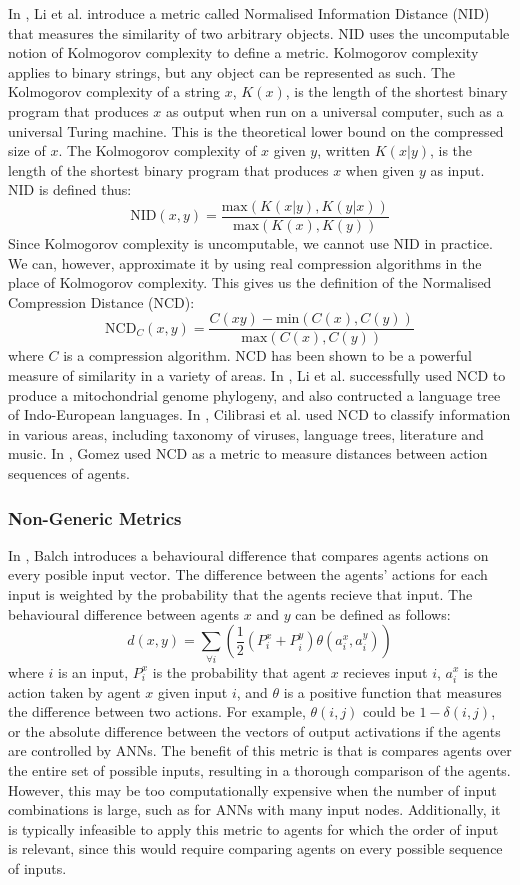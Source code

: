 \documentclass[12pt]{article} %
\begin{document}
In \cite{Li2004}, Li et al. introduce a metric called Normalised Information Distance (NID) that measures the similarity of two arbitrary objects. NID uses the uncomputable notion of Kolmogorov complexity to define a metric. Kolmogorov complexity applies to binary strings, but any object can be represented as such. The Kolmogorov complexity of a string $x$, $K(x)$, is the length of the shortest binary program that produces $x$ as output when run on a universal computer, such as a universal Turing machine. This is the theoretical lower bound on the compressed size of $x$. The Kolmogorov complexity of $x$ given $y$, written $K(x|y)$, is the length of the shortest binary program that produces $x$ when given $y$ as input. NID is defined thus:
\[
\text{NID}(x,y) = \frac{\text{max}(K(x|y), K(y|x))}{\text{max}(K(x), K(y))}
\]
Since Kolmogorov complexity is uncomputable, we cannot use NID in practice. We can, however, approximate it by using real compression algorithms in the place of Kolmogorov complexity. This gives us the definition of the Normalised Compression Distance (NCD):
\[
\text{NCD}_C(x,y) = \frac{C(xy) - \text{min}(C(x), C(y))}{\text{max}(C(x),C(y))}
\]
where $C$ is a compression algorithm. NCD has been shown to be a powerful measure of similarity in a variety of areas. In \cite{Li2004}, Li et al. successfully used NCD to produce a mitochondrial genome phylogeny, and also contructed a language tree of Indo-European languages. In \cite{Cilibrasi2005}, Cilibrasi et al. used NCD to classify information in various areas, including taxonomy of viruses, language trees, literature and music. In \cite{Gomez2009}, Gomez used NCD as a metric to measure distances between action sequences of agents.

\subsubsection{Non-Generic Metrics}

In \cite{Balch1997}, Balch introduces a behavioural difference that compares agents actions on every posible input vector. The difference between the agents' actions for each input is weighted by the probability that the agents recieve that input. The behavioural difference between agents $x$ and $y$ can be defined as follows:
\[
d(x,y) = \displaystyle\sum\limits_{\forall i}\left(\frac{1}{2}(P_i^x + P_i^y)\theta(a_i^x,a_i^y)\right)
\]
where $i$ is an input, $P_i^x$ is the probability that agent $x$ recieves input $i$, $a_i^x$ is the action taken by agent $x$ given input $i$, and $\theta$ is a positive function that measures the difference between two actions. For example, $\theta(i,j)$ could be $1 - \delta(i,j)$, or the absolute difference between the vectors of output activations if the agents are controlled by ANNs. The benefit of this metric is that is compares agents over the entire set of possible inputs, resulting in a thorough comparison of the agents. However, this may be too computationally expensive when the number of input combinations is large, such as for ANNs with many input nodes. Additionally, it is typically infeasible to apply this metric to agents for which the order of input is relevant, since this would require comparing agents on every possible sequence of inputs.
\end{document}
